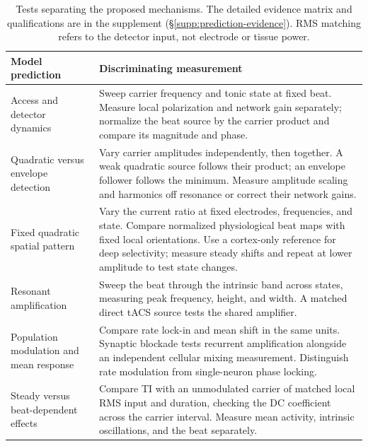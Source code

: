 \begin{table}[htbp]
\centering\small
\renewcommand{\arraystretch}{1.15}
\begin{tabular}{@{}>{\raggedright\arraybackslash}p{}
 >{\raggedright\arraybackslash}p{}@{}}
\toprule
Model prediction & Discriminating measurement \\
\midrule
Access and detector dynamics & Sweep carrier frequency and tonic state at fixed
beat. Measure local polarization and network gain separately; normalize the
beat source by the carrier product and compare its magnitude and phase. \\[4pt]
Quadratic versus envelope detection & Vary carrier amplitudes independently,
then together. A weak quadratic source follows their product; an envelope
follower follows the minimum. Measure amplitude scaling and harmonics off
resonance or correct their network gains. \\[4pt]
Fixed quadratic spatial pattern & Vary the current ratio at fixed electrodes,
frequencies, and state. Compare normalized physiological beat maps with fixed
local orientations. Use a cortex-only reference for deep selectivity; measure
steady shifts and repeat at lower amplitude to test state changes. \\[4pt]
Resonant amplification & Sweep the beat through the intrinsic band across
states, measuring peak frequency, height, and width. A matched direct tACS
source tests the shared amplifier. \\[4pt]
Population modulation and mean response & Compare rate lock-in and mean shift
in the same units. Synaptic blockade tests recurrent amplification alongside
an independent cellular mixing measurement. Distinguish rate modulation from
single-neuron phase locking. \\[4pt]
Steady versus beat-dependent effects & Compare TI with an unmodulated carrier
of matched local RMS input and duration, checking the DC coefficient across
the carrier interval. Measure mean activity, intrinsic oscillations, and the
beat separately. \\
\bottomrule
\end{tabular}
\caption{Tests separating the proposed mechanisms. The detailed evidence matrix
and qualifications are in the supplement (\S\ref{supp:prediction-evidence}).
RMS matching refers to the detector input, not electrode or tissue power.}
\label{tab:predictions}
\end{table}

\FloatBarrier
